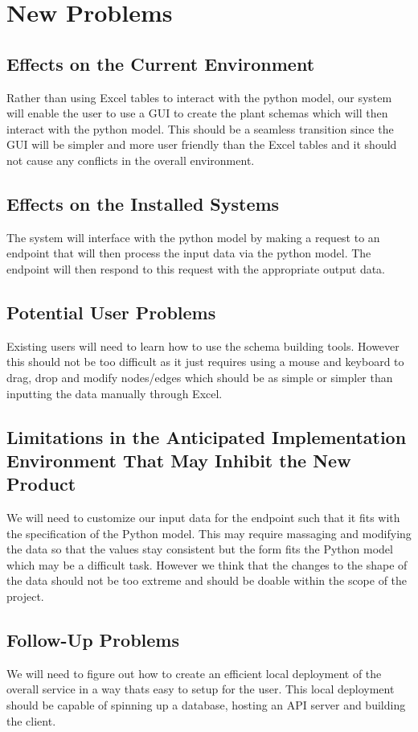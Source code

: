 \documentclass[12pt]{article}
\begin{document}
\section{New Problems}
\subsection{Effects on the Current Environment}
Rather than using Excel tables to interact with the python model, our system will enable the user to use a GUI to create the plant schemas which will then interact with the python model. This should be a seamless transition since the GUI will be simpler and more user friendly than the Excel tables and it should not cause any conflicts in the overall environment. 
\subsection{Effects on the Installed Systems}
The system will interface with the python model by making a request to an endpoint that will then process the input data via the python model. The endpoint will then respond to this request with the appropriate output data. 
\subsection{Potential User Problems}
Existing users will need to learn how to use the schema building tools. However this should not be too difficult as it just requires using a mouse and keyboard to drag, drop and modify nodes/edges which should be as simple or simpler than inputting the data manually through Excel. 
\subsection{Limitations in the Anticipated Implementation Environment That May
Inhibit the New Product}
We will need to customize our input data for the endpoint such that it fits with the specification of the Python model. This may require massaging and modifying the data so that the values stay consistent but the form fits the Python model which may be a difficult task. However we think that the changes to the shape of the data should not be too extreme and should be doable within the scope of the project. 
\subsection{Follow-Up Problems}
We will need to figure out how to create an efficient local deployment of the overall service in a way thats easy to setup for the user. This local deployment should be capable of spinning up a database, hosting an API server and building the client. 
\end{document}
